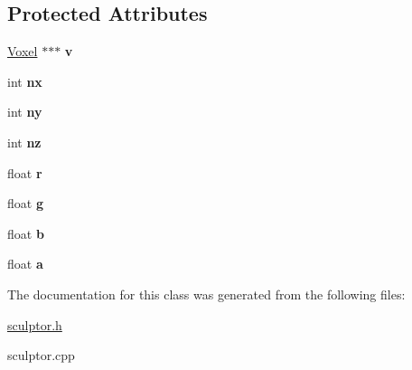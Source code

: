 \subsection*{Protected Attributes}
\begin{DoxyCompactItemize}
\item 
\mbox{\label{classSculptor_a4ca53a2f2fbf41ca42dfe729ebe693f1}} 
\mbox{\hyperlink{structVoxel}{Voxel}} $\ast$$\ast$$\ast$ {\bfseries v}
\item 
\mbox{\label{classSculptor_ad1e32f9042538419a3bc7b376f7813b8}} 
int {\bfseries nx}
\item 
\mbox{\label{classSculptor_a1ce2ff97ec94927928ab3f5ec4ba6761}} 
int {\bfseries ny}
\item 
\mbox{\label{classSculptor_a33204e7df26a7ee4c7192381a24335d3}} 
int {\bfseries nz}
\item 
\mbox{\label{classSculptor_a3f5d2ec3b66d645019b8d81c810a1cd8}} 
float {\bfseries r}
\item 
\mbox{\label{classSculptor_a208c06af69a81a1568df4493868816f1}} 
float {\bfseries g}
\item 
\mbox{\label{classSculptor_a7aafd7305ea634252d8288b60536cd96}} 
float {\bfseries b}
\item 
\mbox{\label{classSculptor_a6fd0157dcf17582f0edd5fddf157604e}} 
float {\bfseries a}
\end{DoxyCompactItemize}


The documentation for this class was generated from the following files\+:\begin{DoxyCompactItemize}
\item 
\mbox{\hyperlink{sculptor_8h}{sculptor.\+h}}\item 
sculptor.\+cpp\end{DoxyCompactItemize}
